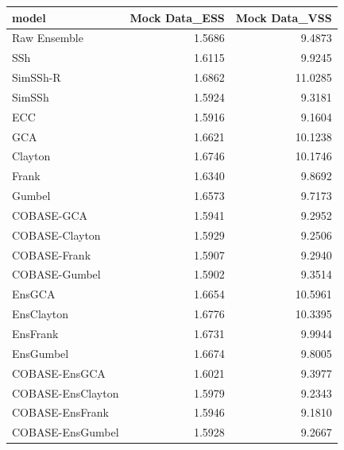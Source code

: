 \begin{table}[ht]
\centering
\begin{tabular}{lrr}
  \hline
model & Mock Data\_ESS & Mock Data\_VSS \\ 
  \hline
Raw Ensemble & 1.5686 & 9.4873 \\ 
  SSh & 1.6115 & 9.9245 \\ 
  SimSSh-R & 1.6862 & 11.0285 \\ 
  SimSSh & 1.5924 & 9.3181 \\ 
  ECC & 1.5916 & 9.1604 \\ 
  GCA & 1.6621 & 10.1238 \\ 
  Clayton & 1.6746 & 10.1746 \\ 
  Frank & 1.6340 & 9.8692 \\ 
  Gumbel & 1.6573 & 9.7173 \\ 
  COBASE-GCA & 1.5941 & 9.2952 \\ 
  COBASE-Clayton & 1.5929 & 9.2506 \\ 
  COBASE-Frank & 1.5907 & 9.2940 \\ 
  COBASE-Gumbel & 1.5902 & 9.3514 \\ 
  EnsGCA & 1.6654 & 10.5961 \\ 
  EnsClayton & 1.6776 & 10.3395 \\ 
  EnsFrank & 1.6731 & 9.9944 \\ 
  EnsGumbel & 1.6674 & 9.8005 \\ 
  COBASE-EnsGCA & 1.6021 & 9.3977 \\ 
  COBASE-EnsClayton & 1.5979 & 9.2343 \\ 
  COBASE-EnsFrank & 1.5946 & 9.1810 \\ 
  COBASE-EnsGumbel & 1.5928 & 9.2667 \\ 
   \hline
\end{tabular}
\end{table}
